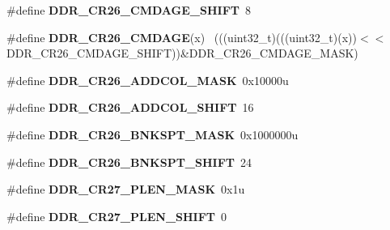 \begin{DoxyCompactItemize}
\item 
\hypertarget{group___d_d_r___register___masks_gacb538d3859e89ad7f95016c930873843}{}\#define {\bfseries D\+D\+R\+\_\+\+C\+R26\+\_\+\+C\+M\+D\+A\+G\+E\+\_\+\+S\+H\+I\+F\+T}~8\label{group___d_d_r___register___masks_gacb538d3859e89ad7f95016c930873843}

\item 
\hypertarget{group___d_d_r___register___masks_gac086b32fdc1a35071b2beaaadef51c12}{}\#define {\bfseries D\+D\+R\+\_\+\+C\+R26\+\_\+\+C\+M\+D\+A\+G\+E}(x)                                          ~(((uint32\+\_\+t)(((uint32\+\_\+t)(x))$<$$<$D\+D\+R\+\_\+\+C\+R26\+\_\+\+C\+M\+D\+A\+G\+E\+\_\+\+S\+H\+I\+F\+T))\&D\+D\+R\+\_\+\+C\+R26\+\_\+\+C\+M\+D\+A\+G\+E\+\_\+\+M\+A\+S\+K)\label{group___d_d_r___register___masks_gac086b32fdc1a35071b2beaaadef51c12}

\item 
\hypertarget{group___d_d_r___register___masks_ga2a94ef4e7ec59f382f2f53c279ba8ebc}{}\#define {\bfseries D\+D\+R\+\_\+\+C\+R26\+\_\+\+A\+D\+D\+C\+O\+L\+\_\+\+M\+A\+S\+K}~0x10000u\label{group___d_d_r___register___masks_ga2a94ef4e7ec59f382f2f53c279ba8ebc}

\item 
\hypertarget{group___d_d_r___register___masks_ga4b8279bb867ece86f65859715f00cc0f}{}\#define {\bfseries D\+D\+R\+\_\+\+C\+R26\+\_\+\+A\+D\+D\+C\+O\+L\+\_\+\+S\+H\+I\+F\+T}~16\label{group___d_d_r___register___masks_ga4b8279bb867ece86f65859715f00cc0f}

\item 
\hypertarget{group___d_d_r___register___masks_ga391de7295f33f58c36b781d9494c638f}{}\#define {\bfseries D\+D\+R\+\_\+\+C\+R26\+\_\+\+B\+N\+K\+S\+P\+T\+\_\+\+M\+A\+S\+K}~0x1000000u\label{group___d_d_r___register___masks_ga391de7295f33f58c36b781d9494c638f}

\item 
\hypertarget{group___d_d_r___register___masks_gac0c096187a244288113584c2ad55964d}{}\#define {\bfseries D\+D\+R\+\_\+\+C\+R26\+\_\+\+B\+N\+K\+S\+P\+T\+\_\+\+S\+H\+I\+F\+T}~24\label{group___d_d_r___register___masks_gac0c096187a244288113584c2ad55964d}

\item 
\hypertarget{group___d_d_r___register___masks_ga4da376fbbfc78af11932ed233826bb0a}{}\#define {\bfseries D\+D\+R\+\_\+\+C\+R27\+\_\+\+P\+L\+E\+N\+\_\+\+M\+A\+S\+K}~0x1u\label{group___d_d_r___register___masks_ga4da376fbbfc78af11932ed233826bb0a}

\item 
\hypertarget{group___d_d_r___register___masks_gabff6ee6e984c68fc0a4d2a7e874a727b}{}\#define {\bfseries D\+D\+R\+\_\+\+C\+R27\+\_\+\+P\+L\+E\+N\+\_\+\+S\+H\+I\+F\+T}~0\label{group___d_d_r___register___masks_gabff6ee6e984c68fc0a4d2a7e874a727b}


\end{DoxyCompactItemize}

